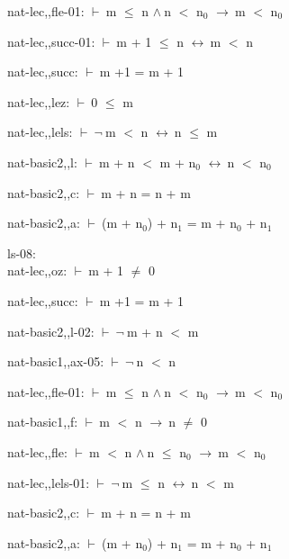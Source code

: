 \documentclass[a4paper]{article}
\newcommand{\Fol}{\mbox{$\vdash\ $}}
\newcommand{\Not}{\mbox{$\neg\ $}}
\newcommand{\And}{\mbox{$\wedge\ $}}
\newcommand{\Imp}{\mbox{$\rightarrow\ $}}
\newcommand{\Equiv}{\mbox{$\leftrightarrow\ $}}
\begin{document}
nat-lec,,fle-01: 
 \Fol m $\le$ n \And n $<$ $\mbox{n}_{0}$ \Imp m $<$ $\mbox{n}_{0}$



nat-lec,,succ-01: 
 \Fol m + 1 $\le$ n \Equiv m $<$ n



nat-lec,,succ: 
 \Fol m +1 = m + 1



nat-lec,,lez: 
 \Fol 0 $\le$ m



nat-lec,,lels: 
 \Fol \Not m $<$ n \Equiv n $\le$ m



nat-basic2,,l: 
 \Fol m + n $<$ m + $\mbox{n}_{0}$ \Equiv n $<$ $\mbox{n}_{0}$



nat-basic2,,c: 
 \Fol m + n = n + m



nat-basic2,,a: 
 \Fol (m + $\mbox{n}_{0}$) + $\mbox{n}_{1}$ = m + $\mbox{n}_{0}$ + $\mbox{n}_{1}$



\bigskip

ls-08:\\ nat-lec,,oz: 
 \Fol m + 1 $\neq$ 0



nat-lec,,succ: 
 \Fol m +1 = m + 1



nat-basic2,,l-02: 
 \Fol \Not m + n $<$ m



nat-basic1,,ax-05: 
 \Fol \Not n $<$ n



nat-lec,,fle-01: 
 \Fol m $\le$ n \And n $<$ $\mbox{n}_{0}$ \Imp m $<$ $\mbox{n}_{0}$



nat-basic1,,f: 
 \Fol m $<$ n \Imp n $\neq$ 0



nat-lec,,fle: 
 \Fol m $<$ n \And n $\le$ $\mbox{n}_{0}$ \Imp m $<$ $\mbox{n}_{0}$



nat-lec,,lels-01: 
 \Fol \Not m $\le$ n \Equiv n $<$ m



nat-basic2,,c: 
 \Fol m + n = n + m



nat-basic2,,a: 
 \Fol (m + $\mbox{n}_{0}$) + $\mbox{n}_{1}$ = m + $\mbox{n}_{0}$ + $\mbox{n}_{1}$
\end{document}
